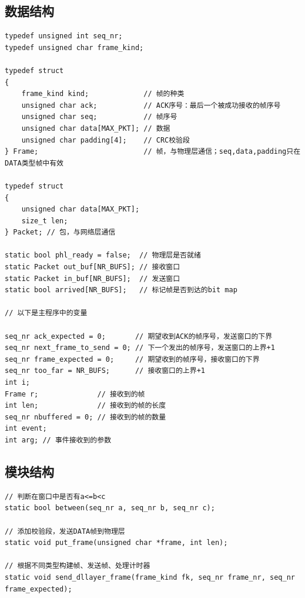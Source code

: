 \documentclass[lang=cn,11pt,a4paper,cite=authornum]{paper}
\begin{document}
\subsection{数据结构}

\begin{code}
\begin{verbatim}
typedef unsigned int seq_nr;
typedef unsigned char frame_kind;

typedef struct
{
    frame_kind kind;             // 帧的种类
    unsigned char ack;           // ACK序号：最后一个被成功接收的帧序号
    unsigned char seq;           // 帧序号
    unsigned char data[MAX_PKT]; // 数据
    unsigned char padding[4];    // CRC校验段
} Frame;                         // 帧，与物理层通信；seq,data,padding只在DATA类型帧中有效

typedef struct
{
    unsigned char data[MAX_PKT];
    size_t len;
} Packet; // 包，与网络层通信

static bool phl_ready = false;  // 物理层是否就绪
static Packet out_buf[NR_BUFS]; // 接收窗口
static Packet in_buf[NR_BUFS];  // 发送窗口
static bool arrived[NR_BUFS];   // 标记帧是否到达的bit map

// 以下是主程序中的变量

seq_nr ack_expected = 0;       // 期望收到ACK的帧序号，发送窗口的下界
seq_nr next_frame_to_send = 0; // 下一个发出的帧序号，发送窗口的上界+1
seq_nr frame_expected = 0;     // 期望收到的帧序号，接收窗口的下界
seq_nr too_far = NR_BUFS;      // 接收窗口的上界+1
int i;
Frame r;              // 接收到的帧
int len;              // 接收到的帧的长度
seq_nr nbuffered = 0; // 接收到的帧的数量
int event;
int arg; // 事件接收到的参数
\end{verbatim}
\end{code}

\subsection{模块结构}

\begin{code}
\begin{verbatim}
// 判断在窗口中是否有a<=b<c
static bool between(seq_nr a, seq_nr b, seq_nr c);

// 添加校验段，发送DATA帧到物理层
static void put_frame(unsigned char *frame, int len);

// 根据不同类型构建帧、发送帧、处理计时器
static void send_dllayer_frame(frame_kind fk, seq_nr frame_nr, seq_nr frame_expected);
\end{verbatim}
\end{code}
\end{document}
